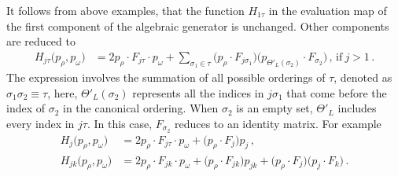 \documentclass[a4paper,12pt]{article}
\makeatletter
\def\nn{\nonumber}
\newcommand{\mdot}{{\cdot}}
\newcommand*{\bigcdot}{}%
\DeclareRobustCommand*{\bigcdot}{%
  \mathbin{\mathpalette\bigcdot@{}}%
}
\newcommand*{\bigcdot@scalefactor}{.6}
\newcommand*{\bigcdot@widthfactor}{1.25}
\newcommand*{\bigcdot@}[2]{%
  \sbox0{$#1\vcenter{}$}%
  \sbox2{$#1\cdot\m@th$}%
  \hbox to \bigcdot@widthfactor\wd2{%
    \hfil
    \raise\ht0\hbox{%
      \scalebox{\bigcdot@scalefactor}{%
        \lower\ht0\hbox{$#1\bullet\m@th$}%
      }%
    }%
    \hfil
  }%
}
\newcommand{\dd}{\bigcdot}
\makeatother
\begin{document}
  It follows from above examples, that the function $H_{1\tau}$ in the evaluation map of the first component of the algebraic generator is unchanged. Other components are reduced to  
\begin{align}
  H_{j\tau}\big(p_\rho,p_\omega\big)&=2 p_{\rho}\mdot F_{j\tau}\mdot p_{\omega}+
\sum_{\sigma_1\in \tau}\limits \Big(p_{\rho}\mdot  F_{j\sigma_1}\Big)\dd\Big( p_{\Theta'_L(\sigma_2)}\mdot F_{\sigma_2}\Big) \, , \, \text{if}~ j>1\, .
\end{align}
%
The expression involves the summation of all possible orderings of $\tau$, denoted as $\sigma_1\sigma_2\equiv \tau$, here, $\Theta'_L(\sigma_2)$ represents all the indices in $j\sigma_1$ that come before the index of $\sigma_2$ in the canonical ordering. When $\sigma_2$ is an empty set, $\Theta'_L$ includes every index in $j\tau$. In this case, $F_{\sigma_2}$ reduces to an identity matrix. For example 
\begin{align}
	H_{j}\big(p_\rho,p_\omega\big)&=2 p_{\rho}\mdot F_{j\tau}\mdot p_{\omega}+ \Big(p_{\rho}\mdot  F_{j}\Big)\dd p_{j}\,,\nn\\
	H_{jk}\big(p_\rho,p_\omega\big)&=2 p_{\rho}\mdot F_{jk}\mdot p_{\omega}+ \Big(p_{\rho}\mdot  F_{jk}\Big)\dd p_{jk}+ \Big(p_{\rho}\mdot  F_{j}\Big)\dd \Big(p_{j}\mdot  F_{k} \Big)\, .
\end{align}
\end{document}
